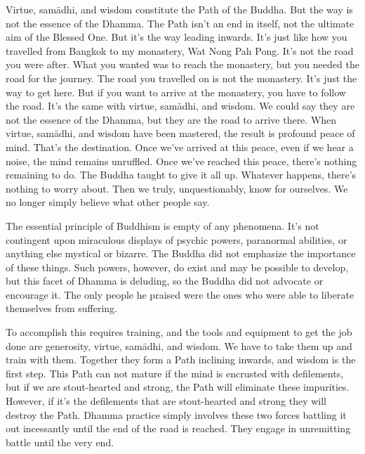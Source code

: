 Virtue, sam\=adhi, and wisdom constitute the Path of the Buddha. But the way is not the essence of the Dhamma. The Path isn't an end in itself, not the ultimate aim of the Blessed One. But it's the way leading inwards. It's just like how you travelled from Bangkok to my monastery, Wat Nong Pah Pong. It's not the road you were after. What you wanted was to reach the monastery, but you needed the road for the journey. The road you travelled on is not the monastery. It's just the way to get here. But if you want to arrive at the monastery, you have to follow the road. It's the same with virtue, sam\=adhi, and wisdom. We could say they are not the essence of the Dhamma, but they are the road to arrive there. When virtue, sam\=adhi, and wisdom have been mastered, the result is profound peace of mind. That's the destination. Once we've arrived at this peace, even if we hear a noise, the mind remains unruffled. Once we've reached this peace, there's nothing remaining to do. The Buddha taught to give it all up. Whatever happens, there's nothing to worry about. Then we truly, unquestionably, know for ourselves. We no longer simply believe what other people say.

The essential principle of Buddhism is empty of any phenomena. It's not contingent upon miraculous displays of psychic powers, paranormal abilities, or anything else mystical or bizarre. The Buddha did not emphasize the importance of these things. Such powers, however, do exist and may be possible to develop, but this facet of Dhamma is deluding, so the Buddha did not advocate or encourage it. The only people he praised were the ones who were able to liberate themselves from suffering.

To accomplish this requires training, and the tools and equipment to get the job done are generosity, virtue, sam\=adhi, and wisdom. We have to take them up and train with them. Together they form a Path inclining inwards, and wisdom is the first step. This Path can not mature if the mind is encrusted with defilements, but if we are stout-hearted and strong, the Path will eliminate these impurities. However, if it's the defilements that are stout-hearted and strong they will destroy the Path. Dhamma practice simply involves these two forces battling it out incessantly until the end of the road is reached. They engage in unremitting battle until the very end.

